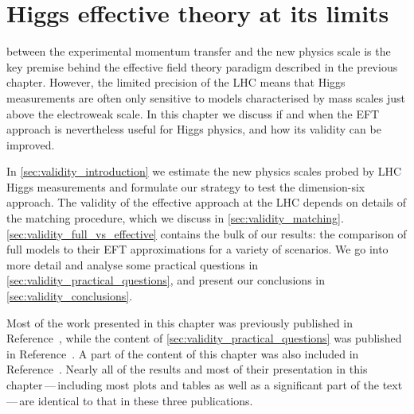 



\chapter{Higgs effective theory at its limits}
\label{chapter:validity}



 between the experimental momentum
transfer and the new physics scale is the key premise behind the
effective field theory paradigm described in the previous chapter.
%
However, the limited precision of the LHC means that Higgs
measurements are often only sensitive to models characterised by mass
scales just above the electroweak scale. In this chapter we discuss if
and when the EFT approach is nevertheless useful for Higgs physics,
and how its validity can be improved.

In \autoref{sec:validity_introduction} we estimate the new physics
scales probed by LHC Higgs measurements and formulate our strategy to
test the dimension-six approach. The validity of the effective
approach at the LHC depends on details of the matching procedure,
which we discuss in
\autoref{sec:validity_matching}. \autoref{sec:validity_full_vs_effective}
contains the bulk of our results: the comparison of full models to
their EFT approximations for a variety of scenarios. We go into more
detail and analyse some practical questions in
\autoref{sec:validity_practical_questions}, and present our
conclusions in \autoref{sec:validity_conclusions}.

Most of the work presented in this chapter was previously published in
Reference~\cite{Brehmer:2015rna}, while the content of
\autoref{sec:validity_practical_questions} was published in
Reference~\cite{Biekotter:2016ecg}. A part of the content of this
chapter was also included in
Reference~\cite{deFlorian:2016spz}. Nearly all of the results and most
of their presentation in this chapter\,---\,including most plots and
tables as well as a significant part of the text\,---\,are identical
to that in these three publications.



